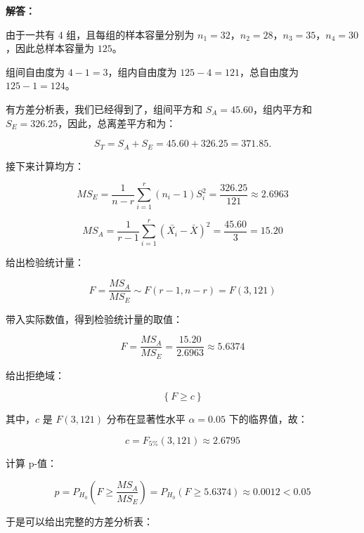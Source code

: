 \documentclass[12pt,a4paper]{article}
\begin{document}
\begin{answerbox}
\textbf{解答：}

由于一共有 4 组，且每组的样本容量分别为 $n_1=32$，$n_2=28$，$n_3=35$，$n_4=30$，因此总样本容量为 $125$。

组间自由度为 $4 - 1 = 3$，组内自由度为 $125 - 4 = 121$，总自由度为 $125 - 1 = 124$。

有方差分析表，我们已经得到了，组间平方和 $S_A = 45.60$，组内平方和 $S_E = 326.25$，因此，总离差平方和为：

$$
S_T = S_A + S_E = 45.60 + 326.25 = 371.85.
$$

接下来计算均方：

$$
MS_E = \frac{1}{n-r} \sum_{i=1}^{r} (n_i - 1) S_i^2 = \frac{326.25}{121} \approx 2.6963
$$

$$
MS_A = \frac{1}{r-1} \sum_{i=1}^{r} (\bar{X_i} - \bar{X})^2 = \frac{45.60}{3} = 15.20
$$

给出检验统计量：

$$
F = \frac{MS_A}{MS_E} \sim F(r-1, n-r) = F(3, 121)
$$

带入实际数值，得到检验统计量的取值：

$$
F = \frac{MS_A}{MS_E} = \frac{15.20}{2.6963} \approx 5.6374
$$

给出拒绝域：

$$
\left\{F \geq c\right\}
$$

其中，$c$ 是 $F(3, 121)$ 分布在显著性水平 $\alpha=0.05$ 下的临界值，故：

$$
c = F_{5\%}(3, 121) \approx 2.6795
$$

计算 p-值：

$$
p = P_{H_0}\left(F \geq \frac{MS_A}{MS_E}\right) = P_{H_0}\left(F \geq 5.6374\right) \approx 0.0012 < 0.05
$$

于是可以给出完整的方差分析表：

\begin{center}
\renewcommand{\arraystretch}{1.2}
\end{center}
\end{answerbox}
\end{document}
